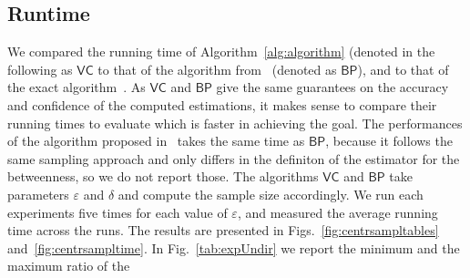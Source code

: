 \subsection{Runtime}\label{sec:centrsamplruntime}
We compared the running time of Algorithm~\ref{alg:algorithm} (denoted in the
following as $\mathsf{VC}$ to that of the algorithm
from~\citep{JacobKLPT05,BrandesP07,GeisbergerSS08}
(denoted as $\mathsf{BP}$), and to that of the exact
algorithm~\citep{Brandes01}. As $\mathsf{VC}$ and $\mathsf{BP}$ give the same
guarantees on the accuracy and confidence of the computed estimations, it makes
sense to compare their running times to evaluate which is faster in achieving
the goal. The performances of the algorithm proposed in~\citep{GeisbergerSS08}
takes the same time as $\mathsf{BP}$, because it follows the same sampling
approach and only differs in the definiton of the estimator for the betweenness,
so we do not report those.
The algorithms $\mathsf{VC}$ and $\mathsf{BP}$ take parameters $\varepsilon$ and
$\delta$ and compute the sample size accordingly. 
 We run each experiments five times for each value of $\varepsilon$, and
measured the average running time across the runs.
The results are presented in Figs.~\ref{fig:centrsampltables} 
and~\ref{fig:centrsampltime}. 
%
In Fig.~\ref{tab:expUndir} we report the minimum and the maximum ratio of the
